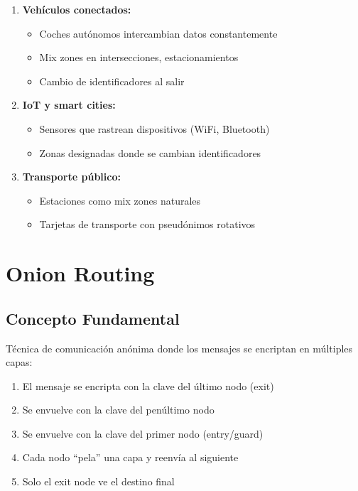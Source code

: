 \documentclass[11pt,a4paper,twoside]{book}
\begin{document}
\begin{enumerate}
    \item \textbf{Veh\'iculos conectados:}
    \begin{itemize}
        \item Coches aut\'onomos intercambian datos constantemente
        \item Mix zones en intersecciones, estacionamientos
        \item Cambio de identificadores al salir
    \end{itemize}
    
    \item \textbf{IoT y smart cities:}
    \begin{itemize}
        \item Sensores que rastrean dispositivos (WiFi, Bluetooth)
        \item Zonas designadas donde se cambian identificadores
    \end{itemize}
    
    \item \textbf{Transporte p\'ublico:}
    \begin{itemize}
        \item Estaciones como mix zones naturales
        \item Tarjetas de transporte con pseud\'onimos rotativos
    \end{itemize}
\end{enumerate}

\section{Onion Routing}
\label{sec:onion-routing}

\subsection{Concepto Fundamental}

\begin{definition}
T\'ecnica de comunicaci\'on an\'onima donde los mensajes se encriptan en m\'ultiples capas:
\begin{enumerate}
    \item El mensaje se encripta con la clave del \'ultimo nodo (exit)
    \item Se envuelve con la clave del pen\'ultimo nodo
    \item Se envuelve con la clave del primer nodo (entry/guard)
    \item Cada nodo ``pela'' una capa y reenv\'ia al siguiente
    \item Solo el exit node ve el destino final
\end{enumerate}
\end{definition}
\end{document}
